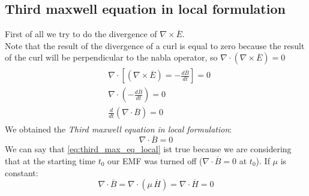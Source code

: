 \subsection*{Third maxwell equation in local formulation}
First of all we try to do the divergence of $\nabla\times\overline{E}$.\\ 
Note that the result of the divergence of a curl is equal to zero because the result of the curl will be perpendicular to the nabla operator, so $\nabla\cdot(\nabla\times\overline{E})=0$
\begin{align}
    \begin{split}
        &\nabla \cdot \left[ (\nabla\times \overline{E})=-\frac{d\overline{B}}{dt}\right]=0\\[5pt]
        &\nabla \cdot \left(-\frac{d\overline{B}}{dt}\right)=0\\[5pt]
        &\frac{d}{dt}(\nabla\cdot \overline{B})=0
    \end{split}
\end{align}
We obtained the \emph{Third maxwell equation in local formulation}:
\begin{equation}\label{eq:third_max_eq_local}
    \nabla\cdot \overline{B}=0
\end{equation}
We can say that \cref{eq:third_max_eq_local} ist true because we are considering that at the starting time $t_0$ our EMF was turned off ($\nabla\cdot \overline{B}=0 $ at $t_0$).
If $\mu$ is constant:
\begin{equation}
    \nabla\cdot \overline{B}=\nabla\cdot(\mu\,\overline{H})=\nabla\cdot\overline{H}=0
\end{equation}
